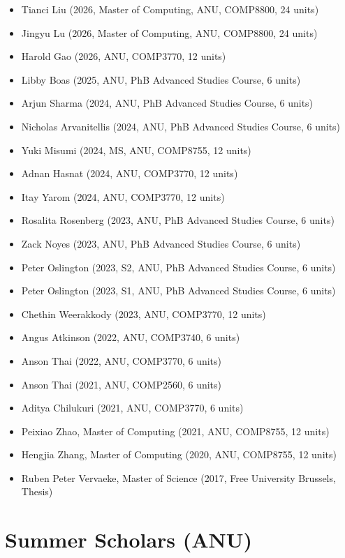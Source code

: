 \documentclass[singlecolumn,singlespace,11pt,a4paper]{article}
\begin{document}
\begin{itemize}
\item Tianci Liu (2026, Master of Computing, ANU, COMP8800, 24 units)
\item Jingyu Lu (2026, Master of Computing, ANU, COMP8800, 24 units)
\item Harold Gao (2026, ANU, COMP3770, 12 units)
\item Libby Boas (2025, ANU, PhB Advanced Studies Course, 6 units)
\item Arjun Sharma (2024, ANU, PhB Advanced Studies Course, 6 units)
\item Nicholas Arvanitellis (2024, ANU, PhB Advanced Studies Course, 6 units)
\item Yuki Misumi (2024, MS, ANU, COMP8755, 12 units)
\item Adnan Hasnat (2024, ANU, COMP3770, 12 units)
\item Itay Yarom (2024, ANU, COMP3770, 12 units)
\item Rosalita Rosenberg (2023, ANU, PhB Advanced Studies Course, 6 units)
\item Zack Noyes (2023, ANU, PhB Advanced Studies Course, 6 units)
\item Peter Oslington (2023, S2, ANU, PhB Advanced Studies Course, 6 units)
\item Peter Oslington (2023, S1, ANU, PhB Advanced Studies Course, 6 units)
\item Chethin Weerakkody (2023, ANU, COMP3770, 12 units)
\item Angus Atkinson (2022, ANU, COMP3740, 6 units)
\item Anson Thai (2022, ANU, COMP3770, 6 units)
\item Anson Thai (2021, ANU, COMP2560, 6 units)
\item Aditya Chilukuri (2021, ANU, COMP3770, 6 units)
\item Peixiao Zhao, Master of Computing (2021, ANU, COMP8755, 12 units)
\item Hengjia Zhang, Master of Computing (2020, ANU, COMP8755, 12 units) 
\item Ruben Peter Vervaeke, Master of Science (2017, Free University Brussels, Thesis)

\end{itemize}

\section*{Summer Scholars (ANU)}
\end{document}
